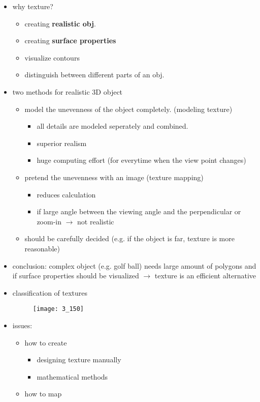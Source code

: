 \documentclass{standalone}
\begin{document}
\begin{itemize}
	\item why texture? 
		\begin{itemize}
			\item creating \textbf{realistic obj}.
			\item creating \textbf{surface properties}
			\item visualize contours
			\item distinguish between different parts of an obj.
		\end{itemize}
	\item two methods for realistic 3D object
		\begin{itemize}
			\item model the unevenness of the object completely. (modeling texture)
				\begin{itemize}
					\item all details are modeled seperately and combined. 
					\item superior realism
					\item huge computing effort (for everytime when the view point changes)
				\end{itemize}
			\item pretend the unevenness with an image (texture mapping)
				\begin{itemize}
					\item reduces calculation
					\item if large angle between the viewing angle and the perpendicular or zoom-in $\rightarrow$ not realistic
				\end{itemize}
			\item should be carefully decided (e.g. if the object is far, texture is more reasonable)
		\end{itemize} 
	\item conclusion: complex object (e.g. golf ball) needs large amount of polygons and if surface properties should be visualized $\rightarrow$ texture is an efficient alternative
	\item classification of textures
		\begin{figure}[H]
			\texttt{[image: 3\_150]}
		\end{figure}
	\item issues:
		\begin{itemize}
			\item how to create
				\begin{itemize}
					\item designing texture manually
					\item mathematical methods
				\end{itemize}
			\item how to map
		\end{itemize}
\end{itemize}
\end{document}
